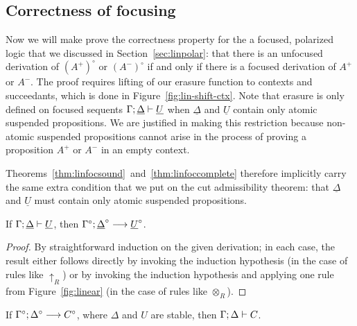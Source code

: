 \subsection{Correctness of focusing}
\label{sec:lincorrectness}



Now we will make prove the correctness property for the a focused,
polarized logic that we discussed in Section~\ref{sec:linpolar}: that
there is an unfocused derivation of $(A^+)^\circ$ or $(A^-)^\circ$ if
and only if there is a focused derivation of $A^+$ or $A^-$.  The
proof requires lifting of our erasure function to contexts and
succeedants, which is done in Figure~\ref{fig:lin-shift-ctx}. Note
that erasure is only defined on focused sequents
${\Gamma};{\underline{\Delta}} \vdash {\underline{U}} \mathstrut$ when
$\underline{\Delta}$ and $\underline{U}$ contain only atomic suspended
propositions. We are justified in making this restriction because
non-atomic suspended propositions cannot arise in the process of
proving a proposition $A^+$ or $A^-$ in an empty context.

Theorems~\ref{thm:linfocsound}~and~\ref{thm:linfoccomplete} therefore
implicitly carry the same extra condition that we put on the cut
admissibility theorem: that $\underline{\Delta}$ and $\underline{U}$
must contain only atomic suspended propositions.

\bigskip
\begin{theorem}\label{thm:linfocsound}
If ${\Gamma};{\underline{\Delta}} \vdash {\underline{U}} \mathstrut$, 
then ${\Gamma^\circ};{\underline{\Delta}^\circ} \longrightarrow {\underline{U}^\circ} \mathstrut$.
\end{theorem}

\begin{proof}
  By straightforward induction on the given derivation; in each case,
  the result either follows directly by invoking the induction
  hypothesis (in the case of rules like ${\uparrow}_R$) or by invoking
  the induction hypothesis and applying one rule from
  Figure~\ref{fig:linear} (in the case of rules like ${\otimes}_R$).
\end{proof}

\begin{theorem}\label{thm:linfoccomplete}
If ${\Gamma^\circ};{\Delta^\circ} \longrightarrow {C^\circ} \mathstrut$, where $\Delta$ and $U$ are
stable,
then ${\Gamma};{\Delta} \vdash {C} \mathstrut$. 
\end{theorem}

